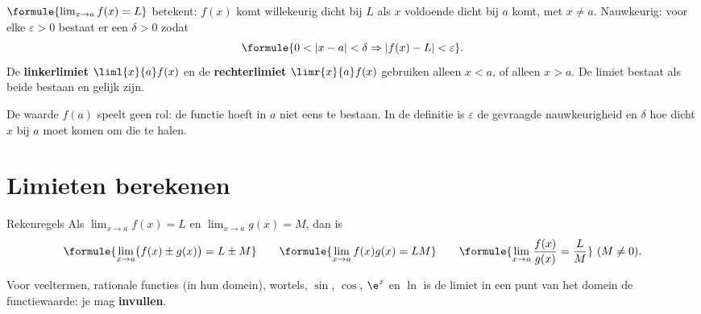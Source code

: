 \begin{theorie}
$\formule{\lim_{x \to a} f(x) = L}$ betekent: $f(x)$ komt willekeurig dicht bij $L$ als $x$ voldoende dicht bij $a$ komt, met $x \neq a$. Nauwkeurig: voor elke $\varepsilon > 0$ bestaat er een $\delta > 0$ zodat
\[\formule{0 < |x - a| < \delta \Rightarrow |f(x) - L| < \varepsilon}.\]
De \textbf{\textcolor{accent}{linkerlimiet}} $\liml{x}{a} f(x)$ en de \textbf{\textcolor{accent}{rechterlimiet}} $\limr{x}{a} f(x)$ gebruiken alleen $x < a$, of alleen $x > a$. De limiet bestaat als beide bestaan en gelijk zijn.
\end{theorie}

De waarde $f(a)$ speelt geen rol: de functie hoeft in $a$ niet eens te bestaan. In de definitie is $\varepsilon$ de gevraagde nauwkeurigheid en $\delta$ hoe dicht $x$ bij $a$ moet komen om die te halen.


\begin{oefeningen}
\end{oefeningen}

\section{Limieten berekenen}

\begin{theorie}
\begin{stelling}{Rekenregels}
Als $\lim_{x \to a} f(x) = L$ en $\lim_{x \to a} g(x) = M$, dan is
\[\formule{\lim_{x \to a} \bigl(f(x) \pm g(x)\bigr) = L \pm M} \qquad \formule{\lim_{x \to a} f(x)g(x) = LM} \qquad \formule{\lim_{x \to a} \frac{f(x)}{g(x)} = \frac{L}{M}} \ (M \neq 0).\]
\end{stelling}
Voor veeltermen, rationale functies (in hun domein), wortels, $\sin$, $\cos$, $\e^x$ en $\ln$ is de limiet in een punt van het domein de functiewaarde: je mag \textbf{\textcolor{accent}{invullen}}.
\end{theorie}

